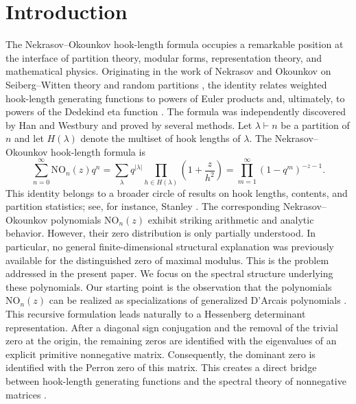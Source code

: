 \documentclass[11pt,reqno]{amsart}
\theoremstyle{plain}
\theoremstyle{remark}
\theoremstyle{definition}
\numberwithin{equation}{section}
\newcommand{\nop}{\mathrm{NO}}
\begin{document}
\section{Introduction}


The Nekrasov--Okounkov hook-length formula occupies a remarkable position at the
interface of partition theory, modular forms, representation theory, and mathematical
physics. Originating in the work of Nekrasov and Okounkov on Seiberg--Witten theory
and random partitions \cite{NO06}, the identity relates weighted hook-length generating
functions to powers of Euler products and, ultimately, to powers of the Dedekind eta
function \cite{Ne55,On04}. The formula was independently discovered by Han \cite{Ha10} and
Westbury \cite{We06} and proved by several methods.
Let $\lambda\vdash n$ be a partition of $n$ %
and let $H(\lambda)$
denote the multiset of hook lengths of $\lambda$. %
The Nekrasov--Okounkov hook-length formula is
\begin{equation*} \label{hook length}
\sum_{n=0}^{\infty} \nop _n(z)q^n
=
\sum_{\lambda %
}
q^{|\lambda|}
\prod_{h\in H(\lambda)}
\left(1+\frac{z}{h^2}\right)
=
\prod_{m=1}^{\infty}(1-q^m)^{-z-1}.
\end{equation*}
This identity belongs to a broader circle of results on hook lengths, contents, and partition statistics; see, for instance, Stanley \cite{St10}.
The corresponding Nekrasov--Okounkov polynomials $\nop _n(z)$ exhibit striking arithmetic
and analytic behavior.
However, their zero distribution is only partially understood. In particular,
no general finite-dimensional structural explanation was previously available
for the distinguished zero of maximal modulus. This is the problem addressed
in the present paper.
We focus on the spectral structure underlying these polynomials. Our starting
point is the observation that the polynomials $\nop _n(z)$ can be realized as
specializations of generalized D'Arcais polynomials \cite{DA13,HN20}. This
recursive formulation leads naturally to a Hessenberg determinant
representation. After a diagonal sign conjugation and the removal of the
trivial zero at the origin, the remaining zeros are identified with the
eigenvalues of an explicit primitive nonnegative matrix. Consequently, the
dominant zero is identified with the Perron zero of this matrix. This creates
a direct bridge between hook-length generating functions and the spectral
theory of nonnegative matrices \cite{BP94,HJ12,Se06}.
\end{document}
